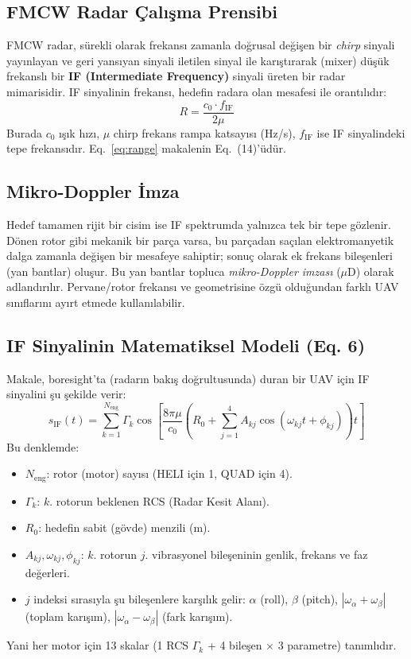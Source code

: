 \documentclass[11pt,a4paper]{article}
\begin{document}
\subsection{FMCW Radar Çalışma Prensibi}
FMCW radar, sürekli olarak frekansı zamanla doğrusal değişen bir \emph{chirp} sinyali yayınlayan
ve geri yansıyan sinyali iletilen sinyal ile karıştırarak (mixer) düşük frekanslı bir
\textbf{IF (Intermediate Frequency)} sinyali üreten bir radar mimarisidir. IF sinyalinin frekansı,
hedefin radara olan mesafesi ile orantılıdır:
\begin{equation}
R = \frac{c_0 \cdot f_{\text{IF}}}{2\mu}
\label{eq:range}
\end{equation}
Burada $c_0$ ışık hızı, $\mu$ chirp frekans rampa katsayısı (Hz/s), $f_{\text{IF}}$ ise
IF sinyalindeki tepe frekansıdır. Eq.~\ref{eq:range} makalenin Eq.~(14)'üdür.

\subsection{Mikro-Doppler İmza}
Hedef tamamen rijit bir cisim ise IF spektrumda yalnızca tek bir tepe gözlenir.
Dönen rotor gibi mekanik bir parça varsa, bu parçadan saçılan elektromanyetik dalga
zamanla değişen bir mesafeye sahiptir; sonuç olarak ek frekans bileşenleri (yan bantlar)
oluşur. Bu yan bantlar topluca \emph{mikro-Doppler imzası} ($\mu$D) olarak adlandırılır.
Pervane/rotor frekansı ve geometrisine özgü olduğundan farklı UAV sınıflarını
ayırt etmede kullanılabilir.

\subsection{IF Sinyalinin Matematiksel Modeli (Eq. 6)}
Makale, boresight'ta (radarın bakış doğrultusunda) duran bir UAV için IF sinyalini şu şekilde verir:
\begin{equation}
s_{\text{IF}}(t) = \sum_{k=1}^{N_{\text{eng}}} \Gamma_k \cos\!\left[\frac{8\pi\mu}{c_0}\left(R_0 + \sum_{j=1}^{4} A_{kj} \cos(\omega_{kj} t + \phi_{kj})\right) t\right]
\label{eq:eq6}
\end{equation}
Bu denklemde:
\begin{itemize}
    \item $N_{\text{eng}}$: rotor (motor) sayısı (HELI için 1, QUAD için 4).
    \item $\Gamma_k$: $k$. rotorun beklenen RCS (Radar Kesit Alanı).
    \item $R_0$: hedefin sabit (gövde) menzili (m).
    \item $A_{kj}, \omega_{kj}, \phi_{kj}$: $k$. rotorun $j$. vibrasyonel bileşeninin
          genlik, frekans ve faz değerleri.
    \item $j$ indeksi sırasıyla şu bileşenlere karşılık gelir: $\alpha$ (roll), $\beta$ (pitch),
          $|\omega_\alpha + \omega_\beta|$ (toplam karışım), $|\omega_\alpha - \omega_\beta|$ (fark karışım).
\end{itemize}
Yani her motor için 13 skalar (1 RCS $\Gamma_k$ + 4 bileşen $\times$ 3 parametre) tanımlıdır.
\end{document}
